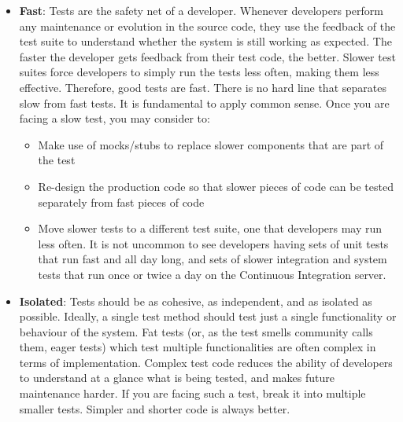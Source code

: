 \begin{itemize}
\item
  \textbf{Fast}: Tests are the safety net of a developer. Whenever
  developers perform any maintenance or evolution in the source code,
  they use the feedback of the test suite to understand whether the
  system is still working as expected. The faster the developer gets
  feedback from their test code, the better. Slower test suites force
  developers to simply run the tests less often, making them less
  effective. Therefore, good tests are fast. There is no hard line that
  separates slow from fast tests. It is fundamental to apply common
  sense. Once you are facing a slow test, you may consider to:

  \begin{itemize}
  \tightlist
  \item
    Make use of mocks/stubs to replace slower components that are part
    of the test
  \item
    Re-design the production code so that slower pieces of code can be
    tested separately from fast pieces of code
  \item
    Move slower tests to a different test suite, one that developers may
    run less often. It is not uncommon to see developers having sets of
    unit tests that run fast and all day long, and sets of slower
    integration and system tests that run once or twice a day on the
    Continuous Integration server.
  \end{itemize}
\item
  \textbf{Isolated}: Tests should be as cohesive, as independent, and as
  isolated as possible. Ideally, a single test method should test just a
  single functionality or behaviour of the system. Fat tests (or, as the
  test smells community calls them, eager tests) which test multiple
  functionalities are often complex in terms of implementation. Complex
  test code reduces the ability of developers to understand at a glance
  what is being tested, and makes future maintenance harder. If you are
  facing such a test, break it into multiple smaller tests. Simpler and
  shorter code is always better.


\end{itemize}
